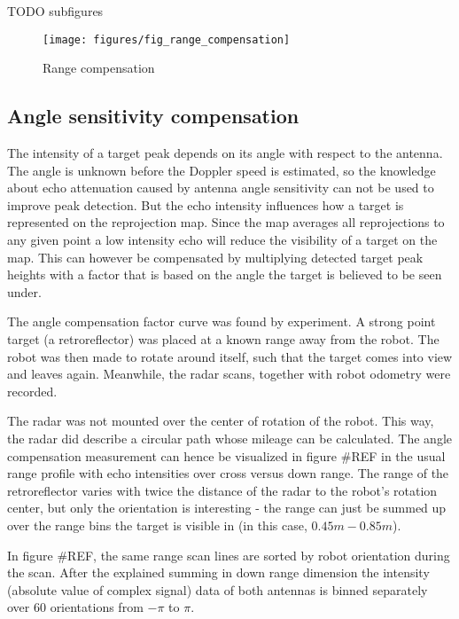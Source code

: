 TODO subfigures
\begin{figure}[htp]
    \centering
    \label{fig:fig_range_compensation}
    \texttt{[image: figures/fig\_range\_compensation]}
    \caption{Range compensation}
\end{figure}

\subsection{Angle sensitivity
compensation}\label{angle-sensitivity-compensation}

The intensity of a target peak depends on its angle with respect to the
antenna. The angle is unknown before the Doppler speed is estimated, so
the knowledge about echo attenuation caused by antenna angle sensitivity
can not be used to improve peak detection. But the echo intensity
influences how a target is represented on the reprojection map. Since
the map averages all reprojections to any given point a low intensity
echo will reduce the visibility of a target on the map. This can however
be compensated by multiplying detected target peak heights with a factor
that is based on the angle the target is believed to be seen under.

The angle compensation factor curve was found by experiment. A strong
point target (a retroreflector) was placed at a known range away from
the robot. The robot was then made to rotate around itself, such that
the target comes into view and leaves again. Meanwhile, the radar scans,
together with robot odometry were recorded.

The radar was not mounted over the center of rotation of the robot. This
way, the radar did describe a circular path whose mileage can be
calculated. The angle compensation measurement can hence be visualized
in figure \#REF in the usual range profile with echo intensities over
cross versus down range. The range of the retroreflector varies with
twice the distance of the radar to the robot's rotation center, but only
the orientation is interesting - the range can just be summed up over
the range bins the target is visible in (in this case,
\(0.45m - 0.85m\)).

In figure \#REF, the same range scan lines are sorted by robot
orientation during the scan. After the explained summing in down range
dimension the intensity (absolute value of complex signal) data of both
antennas is binned separately over 60 orientations from \(-\pi\) to
\(\pi\).

